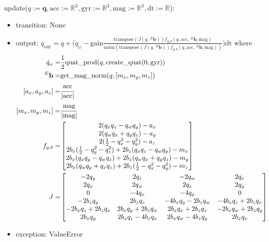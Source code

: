 \documentclass[12pt, titlepage]{article}
\begin{document}
\noindent update($q:=\mathbf{q}, \text{acc}:=\mathbb{R}^3, \text{gyr}:=\mathbb{R}^3, \text{mag}:=\mathbb{R}^3, \text{dt}:=\mathbb{R}$):
\begin{itemize}
\item transition: None
\item output: $q_\text{out} =  q + \Big( \dot{q}_{\omega} - \text{gain}\frac{\text{transpose}(J( q, \,^E\mathbf{b}))f_{g,b}( q, \text{acc}, \,^E\mathbf{b}, \text{mag})}{\text{norm}(\text{transpose}(J( q, \,^E\mathbf{b}))f_{g,b}( q, \text{acc}, \,^E\mathbf{b}, \text{mag}))}\Big) \text{dt}$ where
\begin{align*}
  \dot{q}_{\omega} =& \frac{1}{2} \text{quat\_prod}(q, \text{create\_quat}(0, \text{gyr})) \\
  \,^E\mathbf{b} =& \text{get\_mag\_norm}(q, [m_x, m_y, m_z])\\
  [a_x, a_y, a_z] =& \cfrac{\text{acc}}{|\text{acc}|} \\
  [m_x, m_y, m_z] =& \cfrac{\text{mag}}{|\text{mag}|} \\
  f_{g,b} =& \begin{bmatrix}
    2(q_xq_z-q_wq_y)-a_x \\
    2(q_wq_x+q_yq_z)-a_y \\
    2(\frac{1}{2}-q_x^2-q_y^2)-a_z \\
    2b_x(\frac{1}{2}-q_y^2-q_z^2) + 2b_z(q_xq_z-q_wq_y)-m_x \\
    2b_x(q_xq_y-q_wq_z) + 2b_z(q_wq_x+q_yq_z)-m_y \\
    2b_x(q_wq_y+q_xq_z) + 2b_z(\frac{1}{2}-q_x^2-q_y^2)-m_z
    \end{bmatrix} \\
    J =& \begin{bmatrix}
      -2q_y & 2q_z & -2q_w & 2q_x \\
      2q_x & 2q_w & 2q_z & 2q_y \\
      0 & -4q_x & -4q_y & 0 \\
      -2b_zq_y          & 2b_zq_z         & -4b_xq_y-2b_zq_w & -4b_xq_z+2b_zq_x \\
      -2b_xq_z+2b_zq_x  & 2b_xq_y+2b_zq_w & 2b_xq_x+2b_zq_z  & -2b_xq_w+2b_zq_y \\
      2b_xq_y           & 2b_xq_z-4b_zq_x & 2b_xq_w-4b_zq_y  & 2b_xq_x
      \end{bmatrix}\\
\end{align*}
\item exception: ValueError
\end{itemize}
\end{document}
